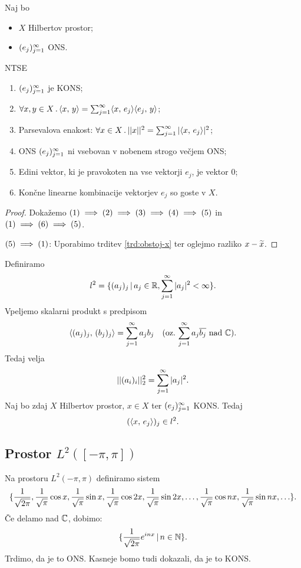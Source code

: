 \begin{izrek}
    \label{izr:parsevalova-enakost}
    Naj bo 
    \begin{itemize}
        \item \(X\) Hilbertov prostor;
        \item \((e_j)_{j=1}^\infty\) ONS.
    \end{itemize}
    NTSE 
    \begin{enumerate}
        \item \((e_j)_{j=1}^\infty\) je KONS;
        \item \(\forall x, y \in X \,.\, \langle x, \, y \rangle = \sum_{j=1}^{\infty} \langle x, \, e_j \rangle \langle e_j, \, y \rangle\);
        \item Parsevalova enakost: \(\forall x \in X \,.\, ||x||^2 = \sum_{j=1}^{\infty} |\langle x, \, e_j \rangle|^2\);
        \item ONS \((e_j)_{j=1}^\infty\) ni vsebovan v nobenem strogo večjem ONS;
        \item Edini vektor, ki je pravokoten na vse vektorji \(e_j\), je vektor \(0\);
        \item Končne linearne kombinacije vektorjev \(e_j\) so goste v \(X\).
    \end{enumerate}
\end{izrek}

\begin{proof}
    Dokažemo \((1) \implies (2) \implies (3) \implies (4) \implies (5)\) in \((1) \implies (6) \implies (5)\).
    
    \((5) \implies (1)\): Uporabimo trditev \ref{trd:obstoj-x} ter oglejmo razliko \(x - \widetilde{x}\).
\end{proof}

\begin{zgled}
    Definiramo 
    \[l^2 = \{(a_j)_j \,|\, a_j \in \mathbb{R}, \sum_{j=1}^{\infty} |a_j|^2 < \infty\}.\]
    Vpeljemo skalarni produkt s predpisom 
    \[\langle (a_j)_j, \, (b_j)_j \rangle = \sum_{j=1}^{\infty}a_jb_j \quad \text{(oz.}\, \sum_{j=1}^{\infty}a_j\overline{b_j} \ \text{nad}\ \mathbb{C}).\]
    Tedaj velja 
    \[||(a_i)_i||_2^2 = \sum_{j=1}^{\infty}|a_j|^2.\]
    Naj bo zdaj \(X\) Hilbertov prostor, \(x \in X\) ter \((e_j)_{j=1}^\infty\) KONS. Tedaj 
    \[(\langle x, \, e_j \rangle)_j \in l^2.\]
\end{zgled}

\newpage
\subsection{Prostor \(L^2([-\pi, \pi])\)}
Na prostoru \(L^2(-\pi, \pi)\) definiramo sistem 
\[
    \{\frac{1}{\sqrt{2\pi}}, \frac{1}{\sqrt{\pi}} \cos x, \frac{1}{\sqrt{\pi}} \sin x, \frac{1}{\sqrt{\pi}} \cos 2x, \frac{1}{\sqrt{\pi}} \sin 2x, \ldots, \frac{1}{\sqrt{\pi}} \cos nx, \frac{1}{\sqrt{\pi}} \sin nx, \ldots\}.
\]
Če delamo nad \(\mathbb{C}\), dobimo:
\[
    \{\frac{1}{\sqrt{2\pi}} e^{inx} \,|\, n \in \mathbb{N}\}.
\]
Trdimo, da je to ONS. Kasneje bomo tudi dokazali, da je to KONS.

